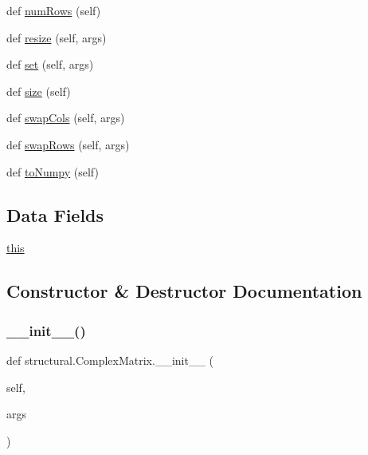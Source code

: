 \begin{DoxyCompactItemize}
\item 
def \hyperlink{classstructural_1_1_complex_matrix_aea904df258fb6de8d369f2a187335336}{num\+Rows} (self)
\item 
def \hyperlink{classstructural_1_1_complex_matrix_ac4039bc5adc1a1329fa56b4f911c8994}{resize} (self, args)
\item 
def \hyperlink{classstructural_1_1_complex_matrix_a5e67b14f6f113186082158e1bc1391b6}{set} (self, args)
\item 
def \hyperlink{classstructural_1_1_complex_matrix_ab55ed57d3b7469476c6690f179ef28d3}{size} (self)
\item 
def \hyperlink{classstructural_1_1_complex_matrix_a0f75acc03fc54a6e7d03e1dec75286b9}{swap\+Cols} (self, args)
\item 
def \hyperlink{classstructural_1_1_complex_matrix_ad77f2d6e2d36859c280297227cd5c496}{swap\+Rows} (self, args)
\item 
def \hyperlink{classstructural_1_1_complex_matrix_affd33aa4061a11439a20d24dcca01d67}{to\+Numpy} (self)
\end{DoxyCompactItemize}
\subsection*{Data Fields}
\begin{DoxyCompactItemize}
\item 
\hyperlink{classstructural_1_1_complex_matrix_ac7168067e868dd5b324583742107c145}{this}
\end{DoxyCompactItemize}


\subsection{Constructor \& Destructor Documentation}
\mbox{\label{classstructural_1_1_complex_matrix_ad1dd6cdcf8186a8cec63cd60c8272323}} 
\subsubsection{\texorpdfstring{\+\_\+\+\_\+init\+\_\+\+\_\+()}{\_\_init\_\_()}}
{\footnotesize\ttfamily def structural.\+Complex\+Matrix.\+\_\+\+\_\+init\+\_\+\+\_\+ (\begin{DoxyParamCaption}\item[{}]{self,  }\item[{}]{args }\end{DoxyParamCaption})}



